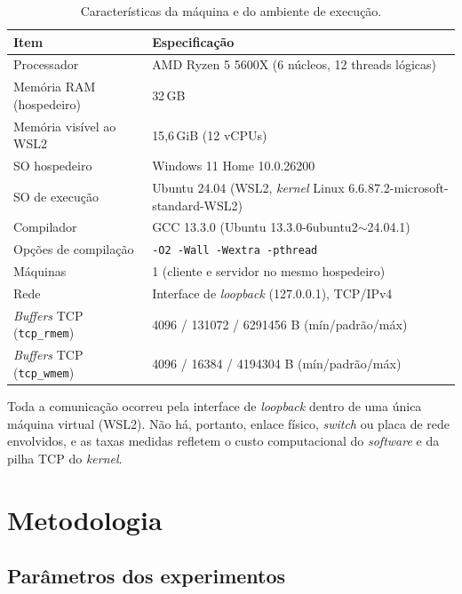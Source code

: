 \documentclass[12pt,a4paper]{article}
\newcommand{\SI}[2]{\mbox{#1\,#2}}
\begin{document}
\begin{table}[H]
\centering
\caption{Características da máquina e do ambiente de execução.}
\label{tab:ambiente}
\begin{tabular}{ll}
\toprule
\textbf{Item} & \textbf{Especificação}\\
\midrule
Processador & AMD Ryzen 5 5600X (6 núcleos, 12 threads lógicas)\\
Memória RAM (hospedeiro) & \SI{32}{GB}\\
Memória visível ao WSL2 & \SI{15{,}6}{GiB} (12 vCPUs)\\
SO hospedeiro & Windows 11 Home 10.0.26200\\
SO de execução & Ubuntu 24.04 (WSL2, \textit{kernel} Linux 6.6.87.2-microsoft-standard-WSL2)\\
Compilador & GCC 13.3.0 (Ubuntu 13.3.0-6ubuntu2$\sim$24.04.1)\\
Opções de compilação & \texttt{-O2 -Wall -Wextra -pthread}\\
Máquinas & 1 (cliente e servidor no mesmo hospedeiro)\\
Rede & Interface de \textit{loopback} (127.0.0.1), TCP/IPv4\\
\textit{Buffers} TCP (\texttt{tcp\_rmem}) & 4096 / 131072 / 6291456 B (mín/padrão/máx)\\
\textit{Buffers} TCP (\texttt{tcp\_wmem}) & 4096 / 16384 / 4194304 B (mín/padrão/máx)\\
\bottomrule
\end{tabular}
\end{table}

Toda a comunicação ocorreu pela interface de \textit{loopback} dentro de uma
única máquina virtual (WSL2). Não há, portanto, enlace físico, \textit{switch}
ou placa de rede envolvidos, e as taxas medidas refletem o custo
computacional do \textit{software} e da pilha TCP do \textit{kernel}.

\section{Metodologia}

\subsection{Parâmetros dos experimentos}
\end{document}
